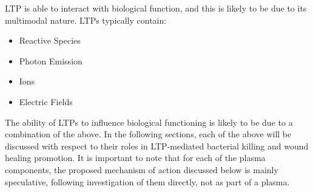 \documentclass[11pt, oneside]{article}   	%
\begin{document}
LTP is able to interact with biological function, and this is likely to be due to its multimodal nature.
LTPs typically contain:
\begin{itemize}
\item Reactive Species
\item Photon Emission
\item Ions
\item Electric Fields
\end{itemize}
The ability of LTPs to influence biological functioning is likely to be due to a combination of the above.
In the following sections, each of the above will be discussed with respect to their roles in LTP-mediated bacterial killing and wound healing promotion.
It is important to note that for each of the plasma components, the proposed mechanism of action discussed below is mainly speculative, following investigation of them directly, not as part of a plasma.
\end{document}
